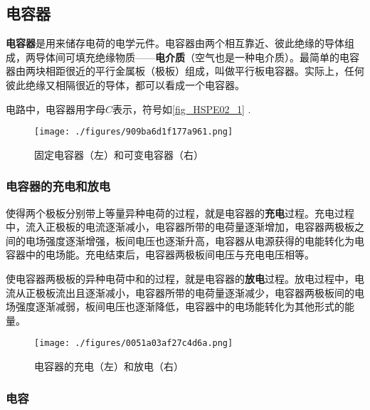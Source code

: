 
\begin{issues}
\issueDraft
\issueTODO
\end{issues}


\subsection{电容器}

\textbf{电容器}是用来储存电荷的电学元件。电容器由两个相互靠近、彼此绝缘的导体组成，两导体间可填充绝缘物质——\textbf{电介质}（空气也是一种电介质）。最简单的电容器由两块相距很近的平行金属板（极板）组成，叫做平行板电容器。实际上，任何彼此绝缘又相隔很近的导体，都可以看成一个电容器。

电路中，电容器用字母$C$表示，符号如\autoref{fig_HSPE02_1} .

\begin{figure}[ht]
\centering
\texttt{[image: ./figures/909ba6d1f177a961.png]}
\caption{固定电容器（左）和可变电容器（右）} \label{fig_HSPE02_1}
\end{figure}

\subsubsection{电容器的充电和放电}

使得两个极板分别带上等量异种电荷的过程，就是电容器的\textbf{充电}过程。充电过程中，流入正极板的电流逐渐减小，电容器所带的电荷量逐渐增加，电容器两极板之间的电场强度逐渐增强，板间电压也逐渐升高，电容器从电源获得的电能转化为电容器中的电场能。充电结束后，电容器两极板间电压与充电电压相等。

使电容器两极板的异种电荷中和的过程，就是电容器的\textbf{放电}过程。放电过程中，电流从正极板流出且逐渐减小，电容器所带的电荷量逐渐减少，电容器两极板间的电场强度逐渐减弱，板间电压也逐渐降低，电容器中的电场能转化为其他形式的能量。

\begin{figure}[ht]
\centering
\texttt{[image: ./figures/0051a03af27c4d6a.png]}
\caption{电容器的充电（左）和放电（右）} \label{fig_HSPE02_2}
\end{figure}

\subsubsection{电容}

